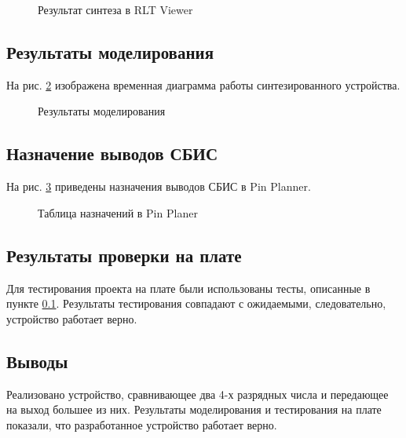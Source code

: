 \begin{figure}[H]
\begin{center}
	\caption{Результат синтеза в RLT Viewer}
	\label{fig:lab3_3_rtl}
\end{center}
\end{figure}

\subsection{Результаты моделирования}
\label{sec:lab3_3_modeling}

На рис. \ref{fig:lab3_3_modeling} изображена временная диаграмма работы синтезированного устройства. 

\begin{figure}[H]
\begin{center}
	\caption{Результаты моделирования}
	\label{fig:lab3_3_modeling}
\end{center}
\end{figure}

\subsection{Назначение выводов СБИС}

На рис. \ref{fig:lab3_3_pins} приведены назначения выводов СБИС в Pin Planner.

\begin{figure}[H]
\begin{center}
	\caption{Таблица назначений в Pin Planer}
	\label{fig:lab3_3_pins}
\end{center}
\end{figure}

\subsection{Результаты проверки на плате}

Для тестирования проекта на плате были использованы тесты, описанные в пункте \ref{sec:lab3_3_modeling}. Результаты тестирования совпадают с ожидаемыми, следовательно, устройство работает верно.

\subsection{Выводы}

Реализовано устройство, сравнивающее два 4-х разрядных числа и передающее на выход большее из них. Результаты моделирования и тестирования на плате показали, что разработанное устройство работает верно.

